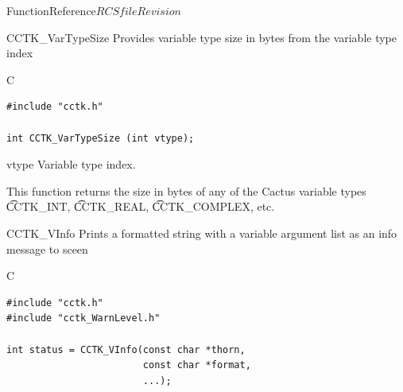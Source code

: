 \begin{cactuspart}{FunctionReference}{$RCSfile$}{$Revision$}
\begin{FunctionDescription}{CCTK\_VarTypeSize}
\label{CCTK-VarTypeSize}
Provides variable type size in bytes from the variable type index

\begin{SynopsisSection}
\begin{Synopsis}{C}
\begin{verbatim}
#include "cctk.h"

int CCTK_VarTypeSize (int vtype);
\end{verbatim}
\end{Synopsis}
\end{SynopsisSection}

\begin{ParameterSection}
\begin{Parameter}{vtype}
Variable type index.
\end{Parameter}
\end{ParameterSection}

\begin{Discussion}
This function returns the size in bytes of any of the Cactus variable
types {\t CCTK\_INT}, {\t CCTK\_REAL}, {\t CCTK\_COMPLEX}, etc.
\end{Discussion}


\end{FunctionDescription}


\begin{FunctionDescription}{CCTK\_VInfo}
\label{CCTK-VInfo}
Prints a formatted string with a variable argument list as an info message
to sceen

\begin{SynopsisSection}
\begin{Synopsis}{C}
\begin{verbatim}
#include "cctk.h"
#include "cctk_WarnLevel.h"

int status = CCTK_VInfo(const char *thorn,
                        const char *format,
                        ...);
\end{verbatim}
\end{Synopsis}
\end{SynopsisSection}


\end{FunctionDescription}
\end{cactuspart}
